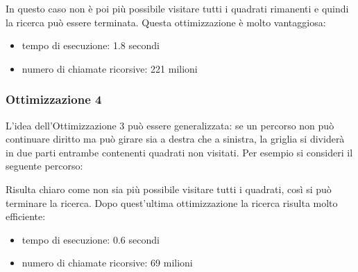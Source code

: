 \begin{center}
\end{center}
In questo caso non è poi più possibile
visitare tutti i quadrati rimanenti e quindi 
la ricerca può essere terminata.
Questa ottimizzazione è molto vantaggiosa:

\begin{itemize}
\item
tempo di esecuzione: 1.8 secondi
\item
numero di chiamate ricorsive: 221 milioni
\end{itemize}

\subsubsection{Ottimizzazione 4}

L'idea dell'Ottimizzazione 3
può essere generalizzata:
se un percorso non può continuare diritto
ma può girare sia a destra che a sinistra,
la griglia si dividerà in due parti entrambe
contenenti quadrati non visitati.
Per esempio si consideri il seguente percorso:

\begin{center}
\end{center}
Risulta chiaro come non sia più possibile visitare tutti i quadrati,
così si può terminare la ricerca.
Dopo quest'ultima ottimizzazione la ricerca risulta molto efficiente:

\begin{itemize}
\item
tempo di esecuzione: 0.6 secondi
\item
numero di chiamate ricorsive: 69 milioni
\end{itemize}


